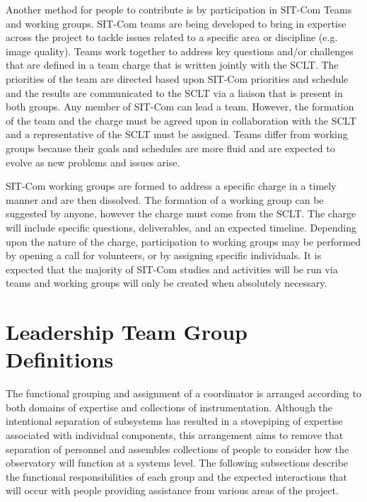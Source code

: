 \documentclass[SE,toc]{lsstdoc}
\begin{document}
Another method for people to contribute is by participation in SIT-Com Teams and working groups.
SIT-Com teams are being developed to bring in expertise across the project to tackle issues related to a specific area or discipline (e.g. image quality).
Teams work together to address key questions and/or challenges that are defined in a team charge that is written jointly with the SCLT.
The priorities of the team are directed based upon SIT-Com priorities and schedule and the results are communicated to the SCLT via a liaison that is present in both groups.
Any member of SIT-Com can lead a team.
However, the formation of the team and the charge must be agreed upon in collaboration with the SCLT and a representative of the SCLT must be assigned.
Teams differ from working groups because their goals and schedules are more fluid and are expected to evolve as new problems and issues arise.

SIT-Com working groups are formed to address a specific charge in a timely manner and are then dissolved.
The formation of a working group can be suggested by anyone, however the charge must come from the SCLT.
The charge will include specific questions, deliverables, and an expected timeline.
Depending upon the nature of the charge, participation to working groups may be performed by opening a call for volunteers, or by assigning specific individuals.
It is expected that the majority of SIT-Com studies and activities will be run via teams and working groups will only be created when absolutely necessary.

\section{Leadership Team Group Definitions}
\label{sec:group_definitions}

The functional grouping and assignment of a coordinator is arranged according to both domains of expertise and collections of instrumentation.
Although the intentional separation of subsystems has resulted in a stovepiping of expertise associated with individual components, this arrangement aims to remove that separation of personnel and assembles collections of people to consider how the observatory will function at a systems level.
The following subsections describe the functional responsibilities of each group and the expected interactions that will occur with people providing assistance from various areas of the project.



\appendix
\end{document}
